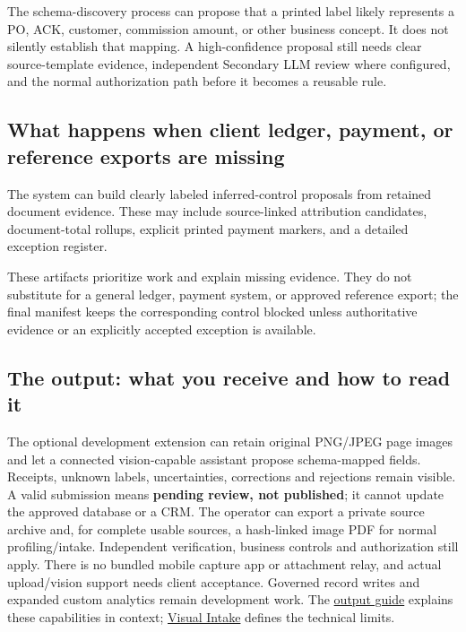 \documentclass[
]{article}
\begin{document}
The schema-discovery process can propose that a printed label likely
represents a PO, ACK, customer, commission amount, or other business
concept. It does not silently establish that mapping. A high-confidence
proposal still needs clear source-template evidence, independent
Secondary LLM review where configured, and the normal authorization path
before it becomes a reusable rule.

\subsection{What happens when client ledger, payment, or reference
exports are
missing}\label{what-happens-when-client-ledger-payment-or-reference-exports-are-missing}

The system can build clearly labeled inferred-control proposals from
retained document evidence. These may include source-linked attribution
candidates, document-total rollups, explicit printed payment markers,
and a detailed exception register.

These artifacts prioritize work and explain missing evidence. They do
not substitute for a general ledger, payment system, or approved
reference export; the final manifest keeps the corresponding control
blocked unless authoritative evidence or an explicitly accepted
exception is available.

\subsection{The output: what you receive and how to read
it}\label{the-output-what-you-receive-and-how-to-read-it}

The optional development extension can retain original PNG/JPEG page
images and let a connected vision-capable assistant propose
schema-mapped fields. Receipts, unknown labels, uncertainties,
corrections and rejections remain visible. A valid submission means
\textbf{pending review, not published}; it cannot update the approved
database or a CRM. The operator can export a private source archive and,
for complete usable sources, a hash-linked image PDF for normal
profiling/intake. Independent verification, business controls and
authorization still apply. There is no bundled mobile capture app or
attachment relay, and actual upload/vision support needs client
acceptance. Governed record writes and expanded custom analytics remain
development work. The \href{CLIENT_OUTPUT_OVERVIEW.md}{output guide}
explains these capabilities in context;
\href{../references/visual-ingestion.md}{Visual Intake} defines the
technical limits.
\end{document}
